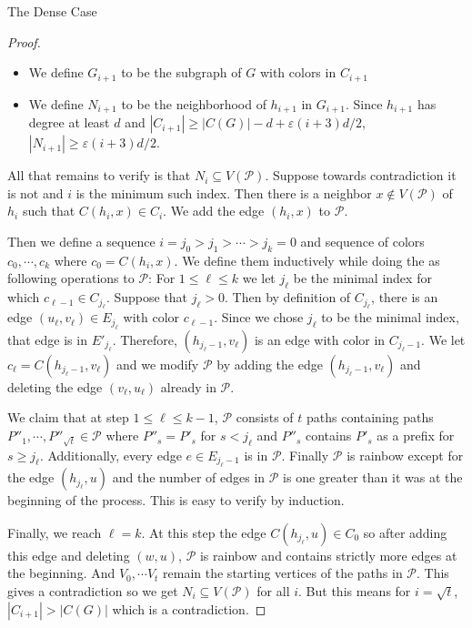 \documentclass[11pt,a4paper]{article}
\newcommand{\vep}{\varepsilon}
\begin{document}
\begin{section}{The Dense Case}
\begin{proof}
\begin{itemize}
	\item We define $G_{i + 1}$ to be the subgraph of $G$ with colors in $C_{i + 1}$
	\item We define $N_{i + 1}$ to be the neighborhood of $h_{i + 1}$ in $G_{i + 1}$. Since $h_{i + 1}$ has degree at least $d$ and $|C_{i + 1}| \geq |C(G)| - d + \vep (i + 3)d/2$, $|N_{i + 1}| \geq \vep (i + 3) d /2$.
\end{itemize}
All that remains to verify is that $N_i \subseteq V(\mathcal P)$. Suppose towards contradiction it is not and $i$ is the minimum such index. Then there is a neighbor $x \not \in V( \mathcal P)$ of $h_i$ such that $C(h_i, x) \in C_i$. We add the edge $(h_i, x)$ to $\mathcal P$.

\medskip 

Then we define a sequence $i = j_0 > j_1 > \cdots > j_k = 0$ and sequence of colors $c_0, \cdots, c_k$ where $c_0 = C(h_i, x)$. We define them inductively while doing the as following operations to $\mathcal P$:
For $1 \leq \ell \leq k$ we let $j_{\ell}$ be the minimal index for which $c_{\ell - 1} \in C_{j_\ell}$. Suppose that $j_{\ell} > 0$. Then by definition of $C_{j_\ell}$, there is an edge $(u_\ell, v_\ell) \in E_{j_\ell}$ with color $c_{\ell - 1}$. Since we chose $j_\ell$ to be the minimal index, that edge is in $E'_{j_{\ell}}$. Therefore, $(h_{j_{\ell} - 1}, v_\ell)$ is an edge with color in $C_{j_{\ell} - 1}$. We let $c_{\ell} = C( h_{j_{\ell} - 1}, v_\ell)$ and we modify $\mathcal P$ by adding the edge $(h_{ {j_\ell} - 1}, v_{\ell})$ and deleting the edge $(v_\ell, u_\ell)$ already in $\mathcal P$.

\medskip


We claim that at step $1 \leq \ell \leq k - 1$, $\mathcal P$ consists of $t$ paths containing paths $P''_1, \cdots, P''_{\sqrt t} \in \mathcal P$ where $P''_{s} = P'_s$ for $s < j_{\ell}$ and $P''_s$ contains $P'_s$ as a prefix for $s \geq j_{\ell}$. Additionally, every edge $e \in E_{j_\ell - 1}$ is in $\mathcal P$. Finally $\mathcal P$ is rainbow except for the edge $(h_{j_\ell}, u)$ and the number of edges in $\mathcal P$ is one greater than it was at the beginning of the process.
This is easy to verify by induction.

\medskip


Finally, we reach $\ell = k$. At this step the edge $C(h_{j_\ell}, u) \in C_0$ so after adding this edge and deleting $(w, u)$, $\mathcal P$ is rainbow and contains strictly more edges at the beginning. And $V_0, \cdots V_{t}$ remain the starting vertices of the paths in $\mathcal P$. This gives a contradiction so we get $N_i \subseteq V(\mathcal P)$ for all $i$. But this means for $i = \sqrt{t}$, $|C_{i + 1}| > |C(G)|$ which is a contradiction.
\end{proof}
\end{section}
\end{document}
